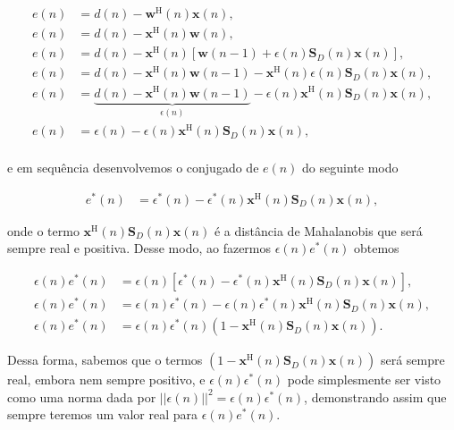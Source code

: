 \begin{align}
    e(n) &= d(n) - \boldsymbol{w}^{\text{H}}(n) \boldsymbol{x}(n), \\
    e(n) &= d(n) - \boldsymbol{x}^{\text{H}}(n) \boldsymbol{w}(n), \\
    e(n) &= d(n) - \boldsymbol{x}^{\text{H}}(n) \left[\boldsymbol{w}(n-1) + \epsilon(n) \boldsymbol{S}_{D}(n) \boldsymbol{x}(n)\right], \\
    e(n) &= d(n) - \boldsymbol{x}^{\text{H}}(n) \boldsymbol{w}(n-1) - \boldsymbol{x}^{\text{H}}(n) \epsilon(n) \boldsymbol{S}_{D}(n) \boldsymbol{x}(n), \\
    e(n) &= \underbrace{d(n) - \boldsymbol{x}^{\text{H}}(n) \boldsymbol{w}(n-1)}_{\epsilon(n)} - \epsilon(n) \boldsymbol{x}^{\text{H}}(n) \boldsymbol{S}_{D}(n) \boldsymbol{x}(n), \\
    e(n) &= \epsilon(n) - \epsilon(n) \boldsymbol{x}^{\text{H}}(n) \boldsymbol{S}_{D}(n) \boldsymbol{x}(n), \\
\end{align}

e em sequência desenvolvemos o conjugado de $e(n)$ do seguinte modo

\begin{align}
    e^{*}(n) &= \epsilon^{*}(n) - \epsilon^{*}(n) \boldsymbol{x}^{\text{H}}(n) \boldsymbol{S}_{D}(n) \boldsymbol{x}(n),
\end{align}

onde o termo $\boldsymbol{x}^{\text{H}}(n) \boldsymbol{S}_{D}(n) \boldsymbol{x}(n)$ é a distância de Mahalanobis que será sempre real e positiva.
Desse modo, ao fazermos $\epsilon(n) e^{*}(n)$ obtemos 

\begin{align}
    \epsilon(n) e^{*}(n) &= \epsilon(n) \left[\epsilon^{*}(n) - \epsilon^{*}(n) \boldsymbol{x}^{\text{H}}(n) \boldsymbol{S}_{D}(n) \boldsymbol{x}(n)\right], \\
    \epsilon(n) e^{*}(n) &= \epsilon(n) \epsilon^{*}(n) - \epsilon(n) \epsilon^{*}(n) \boldsymbol{x}^{\text{H}}(n) \boldsymbol{S}_{D}(n) \boldsymbol{x}(n), \\
    \epsilon(n) e^{*}(n) &= \epsilon(n) \epsilon^{*}(n) \left(1 - \boldsymbol{x}^{\text{H}}(n) \boldsymbol{S}_{D}(n) \boldsymbol{x}(n)\right).
\end{align}

Dessa forma, sabemos que o termos $\left(1 - \boldsymbol{x}^{\text{H}}(n) \boldsymbol{S}_{D}(n) \boldsymbol{x}(n)\right)$ será sempre real, embora nem sempre positivo,
e $\epsilon(n) \epsilon^{*}(n)$ pode simplesmente ser visto como uma norma dada por $||\epsilon(n)||^{2} = \epsilon(n) \epsilon^{*}(n)$, demonstrando assim que sempre 
teremos um valor real para $\epsilon(n) e^{*}(n)$.


